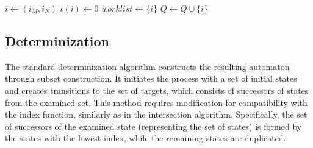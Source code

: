 \documentclass[pdflatex,sn-mathphys-num]{sn-jnl}%
\theoremstyle{thmstyleone}%
\theoremstyle{thmstyletwo}%
\theoremstyle{thmstylethree}%
\begin{document}
\begin{algorithm}
            $i \leftarrow (i_M, i_N)$\;
            $\iota(i) \leftarrow 0$\;
            $worklist \leftarrow \{i\}$\;
            $Q \leftarrow Q \cup \{i\}$\;
            \;
            \normalsize
        \end{algorithm}

        \vspace*{-1em}

    \subsection{Determinization}
        The standard determinization algorithm constructs the resulting automaton through subset construction. It initiates the process with a set of initial states and creates transitions to the set of targets, which consists of successors of states from the examined set. This method requires modification for compatibility with the index function, similarly as in the intersection algorithm. Specifically, the set of successors of the examined state (representing the set of states) is formed by the states with the lowest index, while the remaining states are duplicated.
\end{document}
